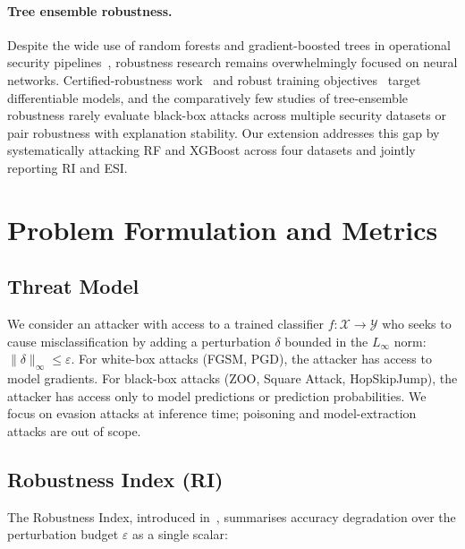 \documentclass[runningheads]{llncs}
\begin{document}
\paragraph{Tree ensemble robustness.}
Despite the wide use of random forests and gradient-boosted trees in operational
security pipelines~\cite{apruzzese2022modeling}, robustness research remains
overwhelmingly focused on neural networks.  Certified-robustness work~\cite{cohen2019certified} and robust training
objectives~\cite{zhang2019theoretically,yang2020defending} target differentiable
models, and the comparatively few studies of tree-ensemble robustness rarely
evaluate black-box attacks across multiple security datasets or pair robustness
with explanation stability.  Our extension addresses this gap by systematically
attacking RF and XGBoost across four datasets and jointly reporting RI and ESI.

\section{Problem Formulation and Metrics}
\label{sec:formulation}

\subsection{Threat Model}

We consider an attacker with access to a trained classifier $f: \mathcal{X}
\rightarrow \mathcal{Y}$ who seeks to cause misclassification by adding a
perturbation $\delta$ bounded in the $L_\infty$ norm: $\|\delta\|_\infty \leq
\varepsilon$.  For white-box attacks (FGSM, PGD), the attacker has access to
model gradients.  For black-box attacks (ZOO, Square Attack, HopSkipJump), the
attacker has access only to model predictions or prediction probabilities.
We focus on evasion attacks at inference time; poisoning and model-extraction
attacks are out of scope.

\subsection{Robustness Index (RI)}

The Robustness Index, introduced in~\cite{khawarey2026empirical}, summarises
accuracy degradation over the perturbation budget $\varepsilon$ as a single scalar:
\end{document}
